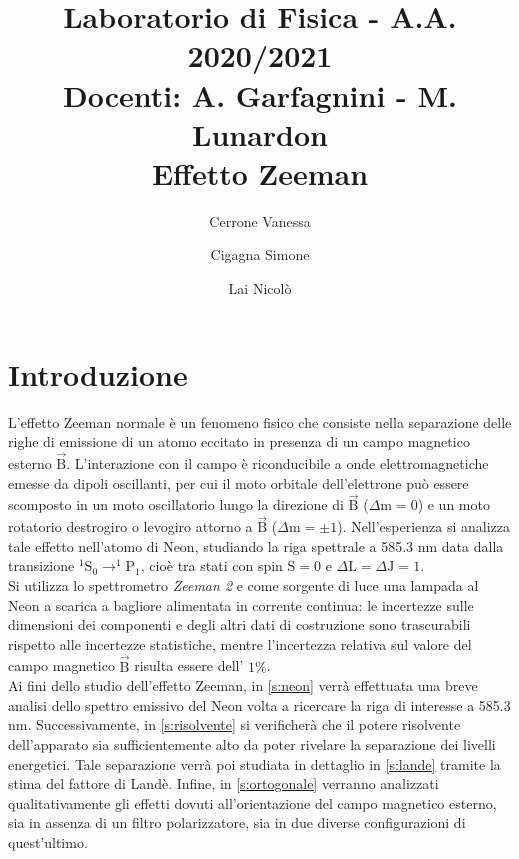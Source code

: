 \documentclass[twocolumn,10pt]{asme2ej}
\date{}
\title{{\huge\bfseries Laboratorio di Fisica} - {\LARGE A.A. 2020/2021} \\ 
    {\LARGE Docenti: A. Garfagnini - M. Lunardon} \\ {\Huge\bfseries Effetto Zeeman}}
\author{Cerrone Vanessa
    \affiliation{
    1200361\\
    vanessa.cerrone@studenti.unipd.it
    }	
}
\author{Cigagna Simone
    \affiliation{
	1193992\\
    simone.cigagna@studenti.unipd.it
    }	
}
\author{Lai Nicolò
    \affiliation{
	1193976\\
    nicolo.lai@studenti.unipd.it
    }	
}
\begin{document}
\maketitle    


\section{Introduzione}\label{s:introduzione}

L'effetto Zeeman normale è un fenomeno fisico che consiste nella separazione delle righe di emissione di un atomo
eccitato in presenza di un campo magnetico esterno $\vec{\text{B}}$. L'interazione con il campo è riconducibile a onde
elettromagnetiche emesse da dipoli oscillanti, per cui il moto orbitale dell'elettrone può essere scomposto in un moto
oscillatorio lungo la direzione di $\vec{\text{B}}$ ($\Delta \text{m} = 0$) e un moto rotatorio destrogiro o levogiro
attorno a $\vec{\text{B}}$ ($\Delta \text{m} = \pm1$). Nell'esperienza si analizza tale effetto nell'atomo di Neon,
studiando la riga spettrale a 585.3 \si{\nano \metre} data dalla transizione $ ^1\text{S}_0 \rightarrow ^1\text{P}_1$,
cioè tra stati con spin $\text{S} = 0$ e $\Delta \text{L}= \Delta \text{J} = 1$. \\
Si utilizza lo spettrometro \textit{Zeeman 2} e come sorgente di luce una lampada al Neon a scarica a bagliore
alimentata in corrente continua: le incertezze sulle dimensioni dei componenti e degli altri dati di costruzione sono
trascurabili rispetto alle incertezze statistiche, mentre l'incertezza relativa sul valore del campo magnetico
$\vec{\text{B}}$ risulta essere dell' $1\%$.   \\

Ai fini dello studio dell'effetto Zeeman, in \autoref{s:neon} verrà effettuata una breve analisi dello spettro emissivo
del Neon volta a ricercare la riga di interesse a 585.3 \si{\nano \metre}. Successivamente, in \autoref{s:risolvente} si
verificherà che il potere risolvente dell'apparato sia sufficientemente alto da poter rivelare la separazione dei
livelli energetici. Tale separazione verrà poi studiata in dettaglio in \autoref{s:lande} tramite la stima del fattore
di Landè. Infine, in \autoref{s:ortogonale} verranno analizzati qualitativamente gli effetti dovuti all'orientazione del
campo magnetico esterno, sia in assenza di un filtro polarizzatore, sia in due diverse configurazioni di quest'ultimo.
\end{document}
